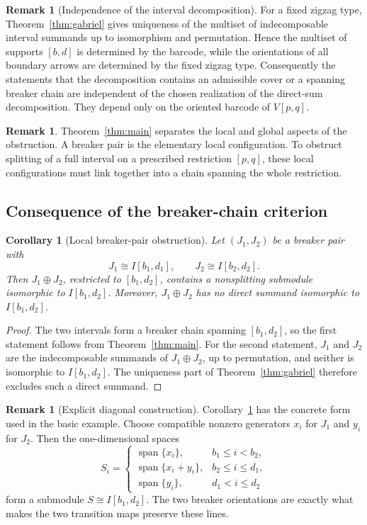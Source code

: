 \documentclass[11pt]{amsart}
\numberwithin{equation}{section}
\newtheorem{corollary}[theorem]{Corollary}
\theoremstyle{definition}
\newtheorem{remark}[theorem]{Remark}
\begin{document}
\begin{remark}[Independence of the interval decomposition]\label{rem:decomp-independence}
For a fixed zigzag type, Theorem~\ref{thm:gabriel} gives uniqueness of the
multiset of indecomposable interval summands up to isomorphism and
permutation.  Hence the multiset of supports $[b,d]$ is determined by the
barcode, while the orientations of all boundary arrows are determined by the
fixed zigzag type.  Consequently the statements that the decomposition
contains an admissible cover or a spanning breaker chain are independent of
the chosen realization of the direct-sum decomposition.  They depend only on
the oriented barcode of $V[p,q]$.
\end{remark}


\begin{remark}
Theorem~\ref{thm:main} separates the local and global aspects of the
obstruction.  A breaker pair is the elementary local configuration.  To
obstruct splitting of a full interval on a prescribed restriction $[p,q]$,
these local configurations must link together into a chain spanning the
whole restriction.
\end{remark}
\subsection{Consequence  of the breaker-chain criterion}
\begin{corollary}[Local breaker-pair obstruction]\label{cor:pair}
Let $(J_1,J_2)$ be a breaker pair with
\[
J_1\cong I[b_1,d_1],
\qquad
J_2\cong I[b_2,d_2].
\]
Then $J_1\oplus J_2$, restricted to $[b_1,d_2]$, contains a nonsplitting
submodule isomorphic to $I[b_1,d_2]$.  Moreover, $J_1\oplus J_2$ has no
direct summand isomorphic to $I[b_1,d_2]$.
\end{corollary}

\begin{proof}
The two intervals form a breaker chain spanning $[b_1,d_2]$, so the first
statement follows from Theorem~\ref{thm:main}.  For the second statement,
$J_1$ and $J_2$ are the indecomposable summands of $J_1\oplus J_2$, up to
permutation, and neither is isomorphic to $I[b_1,d_2]$.  The uniqueness part
of Theorem~\ref{thm:gabriel} therefore excludes such a direct summand.
\end{proof}

\begin{remark}[Explicit diagonal construction]\label{rem:diagonal}
Corollary~\ref{cor:pair} has the concrete form used in the basic example.
Choose compatible nonzero generators $x_i$ for $J_1$ and $y_i$ for $J_2$.
Then the one-dimensional spaces
\[
S_i=
\begin{cases}
\operatorname{span}\{x_i\},& b_1\le i<b_2,\\
\operatorname{span}\{x_i+y_i\},& b_2\le i\le d_1,\\
\operatorname{span}\{y_i\},& d_1<i\le d_2
\end{cases}
\]
form a submodule $S\cong I[b_1,d_2]$.  The two breaker orientations are
exactly what makes the two transition maps preserve these lines.
\end{remark}
\end{document}
